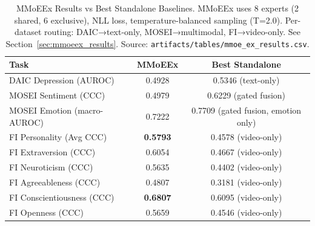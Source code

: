 \begin{table}[htbp]
\centering
\caption{MMoEEx Results vs Best Standalone Baselines. MMoEEx uses 8 experts (2 shared, 6 exclusive), NLL loss, temperature-balanced sampling (T=2.0). Per-dataset routing: DAIC→text-only, MOSEI→multimodal, FI→video-only. See Section~\ref{sec:mmoeex_results}. Source: \texttt{artifacts/tables/mmoe\_ex\_results.csv}.}
\label{tab:mmoeex_results}
\begin{tabular}{lcc}
\toprule
Task & MMoEEx & Best Standalone \\
\midrule
DAIC Depression (AUROC) & 0.4928 & 0.5346 (text-only) \\
MOSEI Sentiment (CCC) & 0.4979 & 0.6229 (gated fusion) \\
MOSEI Emotion (macro-AUROC) & 0.7222 & 0.7709 (gated fusion, emotion only) \\
FI Personality (Avg CCC) & \textbf{0.5793} & 0.4578 (video-only) \\
 FI Extraversion (CCC) & 0.6054 & 0.4667 (video-only) \\
 FI Neuroticism (CCC) & 0.5635 & 0.4402 (video-only) \\
 FI Agreeableness (CCC) & 0.4807 & 0.3181 (video-only) \\
 FI Conscientiousness (CCC) & \textbf{0.6807} & 0.6095 (video-only) \\
 FI Openness (CCC) & 0.5659 & 0.4546 (video-only) \\
\bottomrule
\end{tabular}
\end{table}